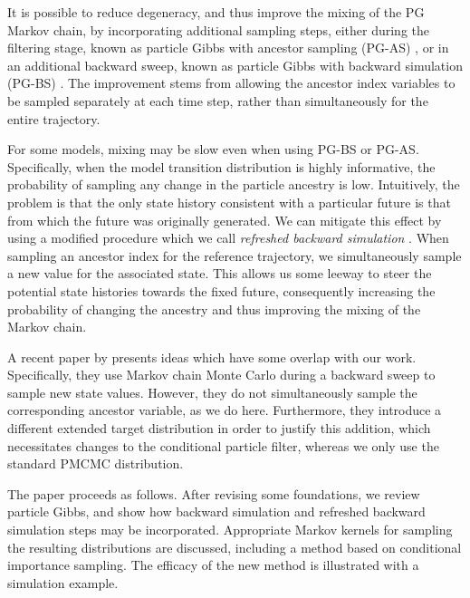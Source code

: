 \documentclass[10pt]{article}
\begin{document}
It is possible to reduce degeneracy, and thus improve the mixing of the PG Markov chain, by incorporating additional sampling steps, either during the filtering stage, known as particle Gibbs with ancestor sampling (PG-AS) \citep{Lindsten2014}, or in an additional backward sweep, known as particle Gibbs with backward simulation (PG-BS) \citep{Whiteley2010b,Lindsten2012}. The improvement stems from allowing the ancestor index variables to be sampled separately at each time step, rather than simultaneously for the entire trajectory.

For some models, mixing may be slow even when using PG-BS or PG-AS. Specifically, when the model transition distribution is highly informative, the probability of sampling any change in the particle ancestry is low. Intuitively, the problem is that the only state history consistent with a particular future is that from which the future was originally generated. We can mitigate this effect by using a modified procedure which we call \emph{refreshed backward simulation} \citep{Bunch2013,Bunch2014}. When sampling an ancestor index for the reference trajectory, we simultaneously sample a new value for the associated state. This allows us some leeway to steer the potential state histories towards the fixed future, consequently increasing the probability of changing the ancestry and thus improving the mixing of the Markov chain.

A recent paper by \cite{Carter2014} presents ideas which have some overlap with our work. Specifically, they use Markov chain Monte Carlo during a backward sweep to sample new state values. However, they do not simultaneously sample the corresponding ancestor variable, as we do here. Furthermore, they introduce a different extended target distribution in order to justify this addition, which necessitates changes to the conditional particle filter, whereas we only use the standard PMCMC distribution.

The paper proceeds as follows. After revising some foundations, we review particle Gibbs, and show how backward simulation and refreshed backward simulation steps may be incorporated. Appropriate Markov kernels for sampling the resulting distributions are discussed, including a method based on conditional importance sampling. The efficacy of the new method is illustrated with a simulation example.
\end{document}
